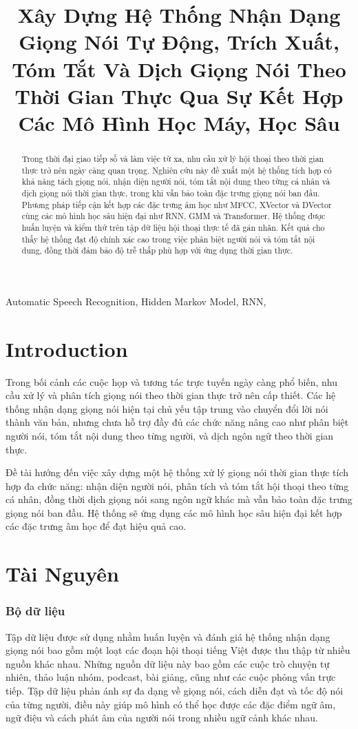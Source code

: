 \documentclass[conference]{IEEEtran}
\title{Xây Dựng Hệ Thống Nhận Dạng Giọng Nói Tự Động, Trích Xuất, Tóm Tắt Và Dịch Giọng Nói Theo Thời Gian Thực Qua Sự Kết Hợp Các Mô Hình Học Máy, Học Sâu}
\author{
    \IEEEauthorblockN{Cao Hoài Sang}
    \IEEEauthorblockA{
        Khoa Hệ Thống Thông Tin \\
        Đại Học Công Nghệ Thông Tin - ĐHQG TP.HCM \\
        Hồ Chí Minh, Việt Nam \\
        21522541@gm.uit.edu.vn
    }
    \and
    \IEEEauthorblockN{Trần Thị B}
    \IEEEauthorblockA{
        Khoa Khoa học Máy tính \\
        Đại học Quốc gia TP.HCM \\
        TP. Hồ Chí Minh, Việt Nam \\
        emailb@example.com
    }
}
\date{}
\begin{document}
\maketitle

\begin{abstract}
    Trong thời đại giao tiếp số và làm việc từ xa, nhu cầu xử lý hội thoại theo thời gian thực trở nên ngày càng quan trọng. Nghiên cứu này đề xuất một hệ thống tích hợp có khả năng tách giọng nói, nhận diện người nói, tóm tắt nội dung theo từng cá nhân và dịch giọng nói thời gian thực, trong khi vẫn bảo toàn đặc trưng giọng nói ban đầu. Phương pháp tiếp cận kết hợp các đặc trưng âm học như MFCC, XVector và DVector cùng các mô hình học sâu hiện đại như RNN, GMM và Transformer. Hệ thống được huấn luyện và kiểm thử trên tập dữ liệu hội thoại thực tế đã gán nhãn. Kết quả cho thấy hệ thống đạt độ chính xác cao trong việc phân biệt người nói và tóm tắt nội dung, đồng thời đảm bảo độ trễ thấp phù hợp với ứng dụng thời gian thực.
\end{abstract}

\begin{IEEEkeywords}
    Automatic Speech Recognition, Hidden Markov Model, RNN,
\end{IEEEkeywords}



\section{Introduction}
Trong bối cảnh các cuộc họp và tương tác trực tuyến ngày càng phổ biến, nhu cầu xử lý và phân tích giọng nói theo thời gian thực trở nên cấp thiết. Các hệ thống nhận dạng giọng nói hiện tại chủ yếu tập trung vào chuyển đổi lời nói thành văn bản, nhưng chưa hỗ trợ đầy đủ các chức năng nâng cao như phân biệt người nói, tóm tắt nội dung theo từng người, và dịch ngôn ngữ theo thời gian thực.

Đề tài hướng đến việc xây dựng một hệ thống xử lý giọng nói thời gian thực tích hợp đa chức năng: nhận diện người nói, phân tích và tóm tắt hội thoại theo từng cá nhân, đồng thời dịch giọng nói sang ngôn ngữ khác mà vẫn bảo toàn đặc trưng giọng nói ban đầu. Hệ thống sẽ ứng dụng các mô hình học sâu hiện đại kết hợp các đặc trưng âm học để đạt hiệu quả cao.

\section{Tài Nguyên}
\subsubsection{Bộ dữ liệu}
Tập dữ liệu được sử dụng nhằm huấn luyện và đánh giá hệ thống nhận dạng giọng nói bao gồm một loạt các đoạn hội thoại tiếng Việt được thu thập từ nhiều nguồn khác nhau. Những nguồn dữ liệu này bao gồm các cuộc trò chuyện tự nhiên, thảo luận nhóm, podcast, bài giảng, cũng như các cuộc phỏng vấn trực tiếp. Tập dữ liệu phản ánh sự đa dạng về giọng nói, cách diễn đạt và tốc độ nói của từng người, điều này giúp mô hình có thể học được các đặc điểm ngữ âm, ngữ điệu và cách phát âm của người nói trong nhiều ngữ cảnh khác nhau.
\end{document}
